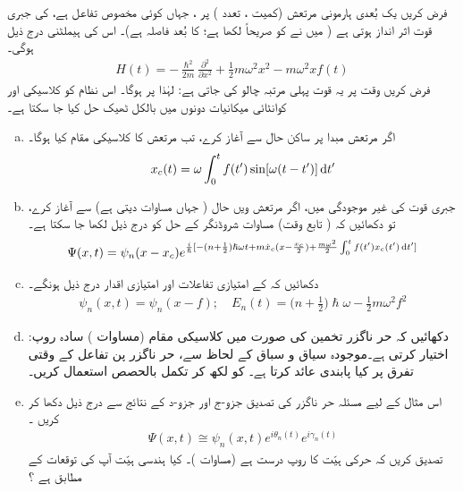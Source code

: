 فرض کریں یک بُعدی ہارمونی مرتعش  (کمیت  ، تعدد )  پر ،  جہاں  کوئی مخصوص تفاعل ہے،  کی  جبری قوت اثر انداز ہوتی ہے ( میں نے  کو صریحاً  لکھا ہے؛   کا بُعد فاصلہ ہے)۔  اس کی  ہیملٹنی درج ذیل ہوگی۔
\begin{align}
H(t) = - \frac{\hslash^2}{2m} \frac{\partial^2}{\partial x^2} + \frac{1}{2} m \omega^2 x^2 - m \omega^2 x f (t)
\end{align}
فرض کریں وقت  پر یہ قوت پہلی مرتبہ چالو کی جاتی ہے:  لہٰذا  پر  ہوگا۔  اس نظام کو کلاسیکی  اور کوانٹائی میکانیات دونوں میں بالکل ٹھیک حل کیا جا سکتا ہے۔ 
\begin{enumerate}[a.]
\item
اگر مرتعش مبدا پر ساکن حال  سے آغاز کرے،  تب مرتعش کا کلاسیکی مقام کیا ہوگا۔  
\begin{align}\label{مساوات_حر_کلاسیکی_مقام}
x_c (t) = \omega \int_0^{t} f(t') \sin [\omega (t - t')] \dif t'
\end{align}
\item
جبری  قوت کی غیر موجودگی میں،  اگر مرتعش  ویں  حال (  جہاں  مساوات    دیتی ہے)  سے آغاز کرے،  تو  دکھائیں کہ ( تابع وقت)  مساوات شروڈنگر کے حل کو درج ذیل لکھا جا سکتا ہے۔ 
\begin{align}
\Psi (x, t) = \psi_n (x - x_c) e^{\frac{i}{\hslash} [- (n + \frac{1}{2}) \hslash \omega t + m \dot{x}_c (x - \frac{x_c}{2}) + \frac{m \omega^2}{2} \int_0^t f (t') x_c (t')  \dif t']}
\end{align}
\item
دکھائیں  کہ  کے امتیازی تفاعلات اور امتیازی اقدار درج ذیل ہونگے۔ 
\begin{align}
\psi_n (x, t) = \psi_n (x - f); \quad E_n (t) = \big ( n + \frac{1}{2} \big ) \hslash \omega - \frac{1}{2} m \omega^2 f^2
\end{align}
\item
دکھائیں کہ حر ناگزر تخمین کی صورت میں کلاسیکی مقام  (مساوات  ) سادہ روپ:   اختیار کرتی ہے۔موجودہ سیاق و سباق کے لحاظ سے، حر ناگزر پن  تفاعل  کے  وقتی تفرق پر کیا پابندی عائد کرتا ہے۔     کو  لکھ کر تکمل بالحصص استعمال کریں۔
\item
اس مثال کے لیے مسئلہ حر ناگزر کی تصدیق جزو-ج  اور  جزو-د کے نتائج سے درج ذیل دکھا کر کریں ۔
\begin{align}
\Psi (x, t) \cong \psi_n (x, t) e^{i \theta_n (t)} e^{i \gamma_n (t)}
\end{align}
تصدیق کریں  کہ حرکی ہیّت کا روپ درست ہے  (مساوات  )۔   کیا ہندسی ہیّت آپ کی  توقعات کے مطابق ہے ؟
\end{enumerate}
